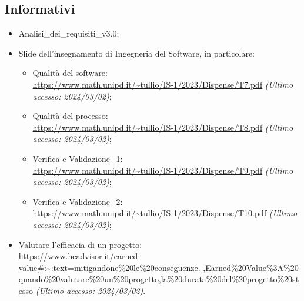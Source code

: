 \subsection{Informativi}
\begin{itemize}
    \item Analisi\_dei\_requisiti\_v3.0;
    \item Slide dell’insegnamento di Ingegneria del Software, in particolare:
        \begin{itemize}
            \item Qualità del software: \\ \url{https://www.math.unipd.it/~tullio/IS-1/2023/Dispense/T7.pdf} \textit{(Ultimo accesso: 2024/03/02)};
            \item Qualità del processo:\\ \url{https://www.math.unipd.it/~tullio/IS-1/2023/Dispense/T8.pdf} \textit{(Ultimo accesso: 2024/03/02)};
            \item Verifica e Validazione\_1:\\ \url{https://www.math.unipd.it/~tullio/IS-1/2023/Dispense/T9.pdf} \textit{(Ultimo accesso: 2024/03/02)};
            \item Verifica e Validazione\_2:\\ \url{https://www.math.unipd.it/~tullio/IS-1/2023/Dispense/T10.pdf} \textit{(Ultimo accesso: 2024/03/02)};
        \end{itemize}
    \item Valutare l'efficacia di un progetto: \\ \url{https://www.headvisor.it/earned-value#:~:text=mitigandone%20le%20conseguenze.-,Earned%20Value%3A%20quando%20valutare%20un%20progetto,la%20durata%20del%20progetto%20stesso} \textit{(Ultimo accesso: 2024/03/02)}.
\end{itemize}
